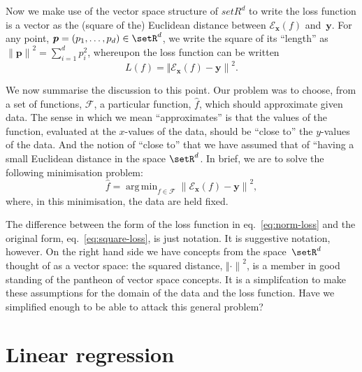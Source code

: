 \documentclass[10pt, a4paper]{article}
\DeclareMathOperator*{\argmin}{arg\,min}
\begin{document}
Now we make use of the vector space structure of $setR^d$ to write the
loss function is a vector as the (square of the) Euclidean distance
between $\mathcal{E}_{\bm{x}}(f)$ and~$\bm{y}$. For any point,
$\bm{p}=(p_1,\dotsc, p_d)\in\setR^d$, we write the square of its
“length” as ${\lVert \bm{p} \rVert}^2 = \sum_{i=1}^d p_i^2$, whereupon
the loss function can be written
\begin{equation}
  \label{eq:norm-loss}
  L(f) = {\Vert \mathcal{E}_{\bm{x}}(f) - \bm{y}\rVert }^2.
\end{equation}

We now summarise the discussion to this point. Our problem was to
choose, from a set of functions, $\mathcal{F}$, a particular function,
$\hat{f}$, which should approximate given data. The sense in which we
mean “approximates” is that the values of the function, evaluated at
the $x$-values of the data, should be “close to” the $y$-values of the
data. And the notion of “close to” that we have assumed that of
“having a small Euclidean distance in the space $\setR^d$. In brief,
we are to solve the following minimisation problem:
\begin{equation}
  \label{eq:least-squares}
  \hat{f} = \argmin_{f\in\mathcal{F}} {\lVert \mathcal{E}_{\bm{x}}(f) - \bm{y}\rVert}^2,
\end{equation}
where, in this minimisation, the data are held fixed.

The difference between the form of the loss function in
eq.~\eqref{eq:norm-loss} and the original form,
eq.~\eqref{eq:square-loss}, is just notation. It is suggestive
notation, however. On the right hand side we have concepts from the
space~$\setR^d$ thought of as a vector space: the squared distance,
${\Vert\cdot\rVert}^2$, is a member in good standing of the pantheon of vector
space concepts. It is a simplifcation to make these assumptions for
the domain of the data and the loss function. Have we simplified enough to be able to
attack this general problem?

\section{Linear regression}
\end{document}
